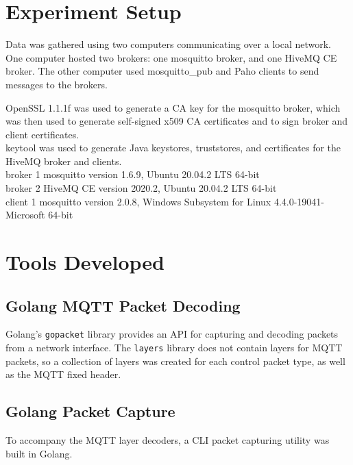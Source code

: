 \documentclass[12pt]{article}
\begin{document}
\section{Experiment Setup}
\par Data was gathered using two computers communicating over a local network. One computer hosted two brokers: one mosquitto broker, and one HiveMQ CE broker. The other computer used mosquitto\_pub and Paho clients to send messages to the brokers.\par
OpenSSL 1.1.1f was used to generate a CA key for the mosquitto broker, which was then used to generate self-signed x509 CA certificates and to sign broker and client certificates.\\
keytool was used to generate Java keystores, truststores, and certificates for the HiveMQ broker and clients.\\
broker 1 mosquitto version 1.6.9, Ubuntu 20.04.2 LTS 64-bit\\
broker 2 HiveMQ CE version 2020.2, Ubuntu 20.04.2 LTS 64-bit\\
client 1 mosquitto version 2.0.8, Windows Subsystem for Linux 4.4.0-19041-Microsoft 64-bit\\


\section{Tools Developed}
\subsection{Golang MQTT Packet Decoding}
Golang's \texttt{gopacket} library provides an API for capturing and decoding packets from a network interface. The \texttt{layers} library does not contain layers for MQTT packets, so a collection of layers was created for each control packet type, as well as the MQTT fixed header. 
\subsection{Golang Packet Capture}
To accompany the MQTT layer decoders, a CLI packet capturing utility was built in Golang. 
\end{document}
